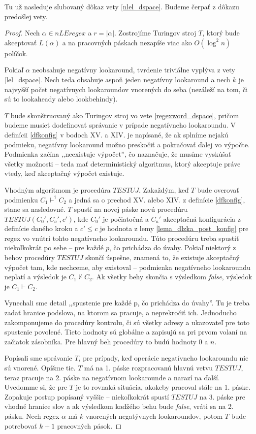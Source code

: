 \documentclass{svk_long_sk}
\def\nle{nLEregex}
\begin{document}
Tu už nasleduje sľubovaný dôkaz vety \ref{nlel_dspace}. Budeme čerpať z dôkazu predošlej vety.
\begin{proof}
Nech $\alpha\in\nle$ a $r=|\alpha|$. Zostrojíme Turingov stroj $T$, ktorý bude akceptovať $L(\alpha)$ a na pracovných páskach nezapíše viac ako $O(\log^2 n)$ políčok.

Pokiaľ $\alpha$ neobsahuje negatívny lookaround, tvrdenie triviálne vyplýva z vety \ref{lel_dspace}. Nech teda obsahuje aspoň jeden negatívny lookaround a nech $k$ je najvyšší počet negatívnych lookaroundov vnorených do seba (nezáleží na tom, či sú to lookaheady alebo look\-behindy).

$T$ bude skonštruovaný ako Turingov stroj vo vete \ref{regexword_dspace}, pričom budeme musieť dodefinovať správanie v prípade negatívneho lookaroundu. V definícii \ref{dfkonfig} v bodoch XV. a XIV. je napísané, že ak splníme nejakú podmieku, negatívny lookaround možno preskočiť a pokračovať ďalej vo výpočte. Podmienka začína ,,neexistuje výpočet'', čo naznačuje, že musíme vyskúšať všetky možnosti -- teda mať deterministický algoritmus, ktorý akceptuje práve vtedy, keď akceptačný výpočet existuje.

Vhodným algoritmom je procedúra $TESTUJ$. Zakaždým, keď $T$ bude overovať podmienku $C_1\mathop{\vdash}^? C_2$ a jedná sa o prechod XV. alebo XIV. z definície \ref{dfkonfig}, stane sa nasledovné. $T$ spustí na novej páske novú procedúru $TESTUJ(C_0',C_a',c')$, kde $C_0'$ je počiatočná a $C_a'$ akceptačná konfigurácia z definície daného kroku a $c' \leq c$ je hodnota z lemy \ref{lema_dlzka_post_konfig} pre regex vo vnútri tohto negatívneho lookaroundu. Túto procedúru treba spustiť niekoľkokrát po sebe -- pre každé $p$, čo prichádza do úvahy. Pokiaľ niektorý z behov procedúry $TESTUJ$ skončí úspešne, znamená to, že existuje akceptačný výpočet tam, kde nechceme, aby existoval -- podmienka negatívneho lookaroundu neplatí a výsledok je $C_1\nvdash C_2$. Ak všetky behy skončia s výsledkom \textit{false}, výsledok je $C_1\vdash C_2$.

Vynechali sme detail ,,spustenie pre každé p, čo prichádza do úvahy''. Tu je treba zadať hranice podslova, na ktorom sa pracuje, a neprekročiť ich. Jednoducho zakomponujeme do procedúry kontrolu, či sú všetky adresy a ukazovateľ pre toto spustenie povolené. Tieto hodnoty sú globálne a zapisujú sa pri prvom volaní na začiatok zásobníka. Pre hlavný beh procedúry to budú hodnoty 0 a $n$.

Popísali sme správanie $T$, pre prípady, keď operácie negatívneho lookaroundu nie sú vnorené. Opíšme tie. $T$ má na 1. páske rozpracovanú hlavnú vetvu $TESTUJ$, teraz pracuje na 2. páske na negatívnom lookarounde a narazí na ďalší. Uvedomme si, že pre $T$ je to rovnaká situácia, akokeby pracoval stále na 1. páske. Zopakuje postup popísaný vyššie -- niekoľkokrát spustí $TESTUJ$ na 3. páske pre vhodné hranice slov a ak výsledkom kadžého behu bude \textit{false}, vráti sa na 2. pásku. Nech regex $\alpha$ má $k$ vnorených negatývnych lookaroundov, potom $T$ bude potrebovať $k+1$ pracovných pások.


\end{proof}
\end{document}
